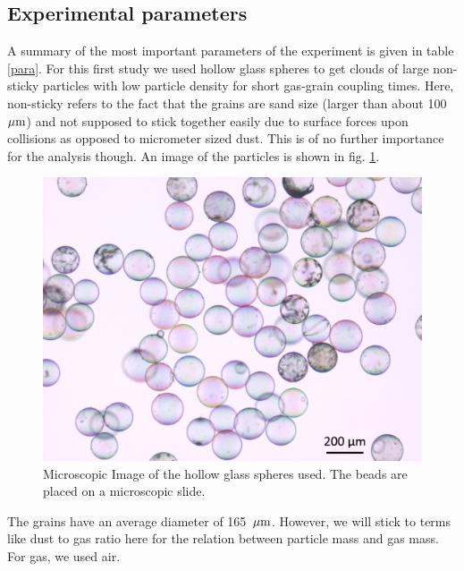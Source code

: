 \subsection{Experimental parameters}

A summary of the most important parameters of the experiment is given in table \ref{para}.
For this first study we used hollow glass spheres to get clouds of large non-sticky particles with low particle density for short gas-grain coupling times. {Here, non-sticky refers to the fact that the grains are sand size (larger than about 100 $\rm \mu m$) and not supposed to stick together easily due to surface forces upon collisions as opposed to micrometer sized dust.} {This is of no further importance for the analysis though.} An image of the particles is shown in 
fig. \ref{fig.hollow}. 
\begin{figure}[h]
\includegraphics[width=\columnwidth]{hollow.pdf}
    \caption{\label{fig.hollow}{ Microscopic Image of the hollow glass spheres used. The beads are placed on a microscopic slide.}}
\end{figure}
The grains have an average diameter of 165~$\rm \mu m$. However, we will stick to terms like dust to gas ratio here for the relation between particle mass and gas mass. For gas, we used air.


